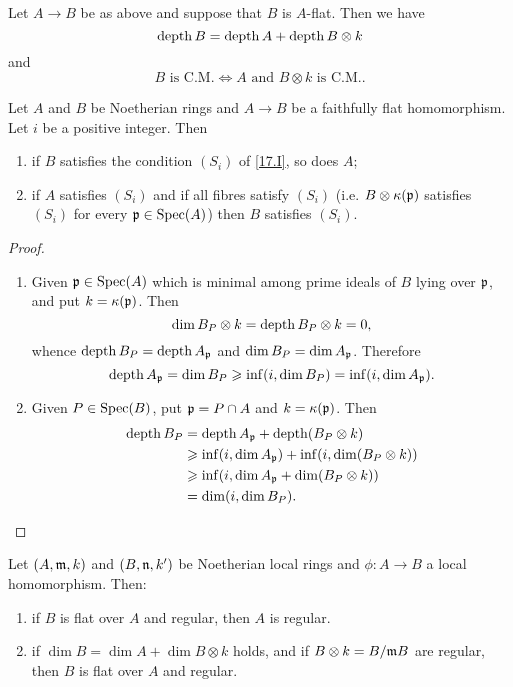 \documentclass[../main]{subfiles}
\begin{document}
\begin{parcorollary}
Let $A \longrightarrow B$ be as above and suppose that $B$ is $A$-flat. Then we have
\[
\operatorname{depth} B = \operatorname{depth} A + \operatorname{depth} B \otimes k
\]
and
\[
B \text { is C.M.}\iff A \text { and } B \otimes k \text { is C.M..}
\]
\end{parcorollary}

\begin{corollary}
Let $A$ and $B$ be Noetherian rings and $A \longrightarrow B$ be a faithfully flat homomorphism. Let $i$ be a positive integer. Then
\begin{enumerate}[label=(\arabic*)]
    \item if $B$ satisfies the condition $(S_i)$ of \ref{17.I}, so does $A$;
    \item if $A$ satisfies $(S_i)$ and if all fibres satisfy $(S_i)$ (i.e. $B \otimes \kappa(\mathfrak{p})$ satisfies $(S_i)$ for every $\mathfrak{p} \in \operatorname{Spec}(A)$) then $B$ satisfies $(S_i)$. 
\end{enumerate}
\end{corollary}

\begin{proof}
\begin{enumerate}[label=(\arabic*)]
    \item Given $\mathfrak{p} \in \operatorname{Spec}(A)$ which is minimal among prime ideals of $B$ lying over $\mathfrak{p}$, and put $k = \kappa(\mathfrak{p})$. Then \[\operatorname{dim} B_P \otimes k = \operatorname{depth}  B_P \otimes k = 0,\] whence $\operatorname{depth} B_P = \operatorname{depth} A_{\mathfrak{p}}$ and $\operatorname{dim} B_P = \operatorname{dim} A_{\mathfrak{p}}$. Therefore \[\operatorname{depth} A_{\mathfrak{p}} = \operatorname{dim} B_P \geqslant \inf (i, \operatorname{dim} B_P) = \inf(i, \operatorname{dim} A_{\mathfrak{p}}).\]
    \item Given $P \in \operatorname{Spec}(B)$, put $\mathfrak{p} = P \cap A$ and $k = \kappa(\mathfrak{p})$. Then
    \begin{align*}
    \operatorname{depth} B_P & = \operatorname{depth} A_{\mathfrak{p}} + \operatorname{depth} (B_P \otimes k) \\ & \geqslant \inf(i, \operatorname{dim} A_{\mathfrak{p}}) + \inf(i, \operatorname{dim} (B_P \otimes k)) \\ & \geqslant \inf(i, \operatorname{dim} A_{\mathfrak{p}} + \operatorname{dim}(B_P \otimes k)) \\ & = \operatorname{dim} (i, \operatorname{dim} B_P).
    \end{align*}
\end{enumerate}
\end{proof}

\begin{partheorem}\label{thm:051}
Let $(A, \mathfrak{m}, k)$ and $(B, \mathfrak{n}, k')$ be Noetherian local rings and $\phi : A \longrightarrow B$ a local homomorphism. Then: 

\begin{enumerate}
    \item if $B$ is flat over $A$ and regular, then $A$ is regular.
    \item if $\dim B = \dim A + \dim B \otimes k$ holds, and if $B \otimes k = B/\mathfrak{m} B$ are regular, then $B$ is flat over $A$ and regular. 
\end{enumerate}
\end{partheorem}
\end{document}

